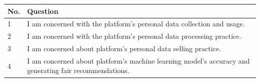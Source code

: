 \documentclass{standalone}
\begin{document}
	\begin{tabular}{|l|l|}
		\hline
		No. & Question\\
		\hline
		1 & I am concerned with the platform's personal data collection and usage.\\
		\hline
		2 & I am concerned with the platform's personal data processing practice.\\
		\hline
		3 & I am concerned about platform's personal data selling practice.\\
		\hline
		4 & I am concerned about platform’s machine learning model's accuracy and generating fair recommendations.\\
		\hline
	\end{tabular}
	
\end{document}
